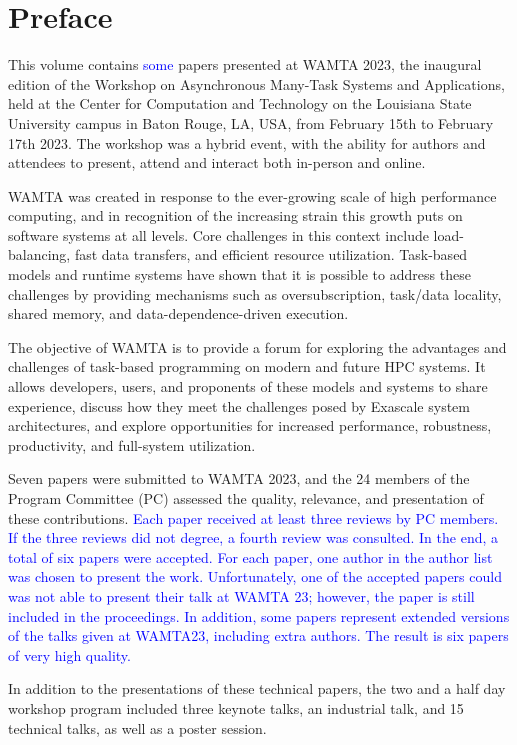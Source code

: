 \documentclass{llncs}
\begin{document}
%
\section*{Preface}
%
This volume contains \textcolor{blue}{some} papers presented at WAMTA 2023, the inaugural edition of the Workshop on Asynchronous Many-Task Systems and Applications, held at the Center for Computation and Technology on the Louisiana State University campus in Baton Rouge, LA, USA, from February 15th to February 17th 2023. The workshop was a hybrid event, with the ability for authors and attendees to present, attend and interact both in-person and online.

WAMTA was created in response to the ever-growing scale of high performance computing, and in recognition of the increasing strain this growth puts on software systems at all levels. Core challenges in this context include load-balancing, fast data transfers, and efficient resource utilization. Task-based models and runtime systems have shown that it is possible to address these challenges by providing mechanisms such as oversubscription, task/data locality, shared memory, and data-dependence-driven execution.

The objective of WAMTA is to provide a forum for exploring the advantages and challenges of task-based programming on modern and future HPC systems. It allows developers, users, and proponents of these models and systems to share experience, discuss how they meet the challenges posed by Exascale system architectures, and explore opportunities for increased performance, robustness, productivity, and full-system utilization.

Seven papers were submitted to WAMTA 2023, and the 24 members of the Program Committee (PC) assessed the quality, relevance, and presentation of these contributions. \textcolor{blue}{Each paper received at least three reviews by PC members. If the three reviews did not degree, a fourth review was consulted. In the end, a total of six papers were accepted. For each paper, one author in the author list was chosen to present the work. Unfortunately, one of the accepted papers could was not able to present their talk at WAMTA 23; however, the paper is still included in the proceedings. In addition, some papers represent extended versions of the talks given at WAMTA23, including extra authors. The result is six papers of very high quality.}

In addition to the presentations of these technical papers, the two and a half day workshop program included three keynote talks, an industrial talk, and 15 technical talks, as well as a poster session.
\end{document}
